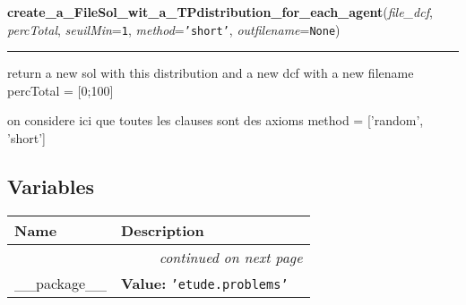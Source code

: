 \hspace{.8\funcindent}\begin{boxedminipage}{\funcwidth}

    \raggedright \textbf{create\_a\_FileSol\_wit\_a\_TPdistribution\_for\_each\_agent}(\textit{file\_dcf}, \textit{percTotal}, \textit{seuilMin}={\tt 1}, \textit{method}={\tt \texttt{'}\texttt{short}\texttt{'}}, \textit{outfilename}={\tt None})

    \vspace{-1.5ex}

    \rule{\textwidth}{0.5\fboxrule}
\setlength{\parskip}{2ex}
    return a new sol with this distribution and a new dcf with a new 
    filename percTotal = [0;100]

    on considere ici que toutes les clauses sont des axioms method = 
    ['random', 'short']

\setlength{\parskip}{1ex}
    \end{boxedminipage}



  \subsection{Variables}

    \vspace{-1cm}
\hspace{\varindent}\begin{longtable}{|p{\varnamewidth}|p{\vardescrwidth}|l}
\cline{1-2}
\cline{1-2} \centering \textbf{Name} & \centering \textbf{Description}& \\
\cline{1-2}
\endhead\cline{1-2}\multicolumn{3}{r}{\small\textit{continued on next page}}\\\endfoot\cline{1-2}
\endlastfoot\raggedright \_\-\_\-p\-a\-c\-k\-a\-g\-e\-\_\-\_\- & \raggedright \textbf{Value:} 
{\tt \texttt{'}\texttt{etude.problems}\texttt{'}}&\\
\cline{1-2}
\end{longtable}

